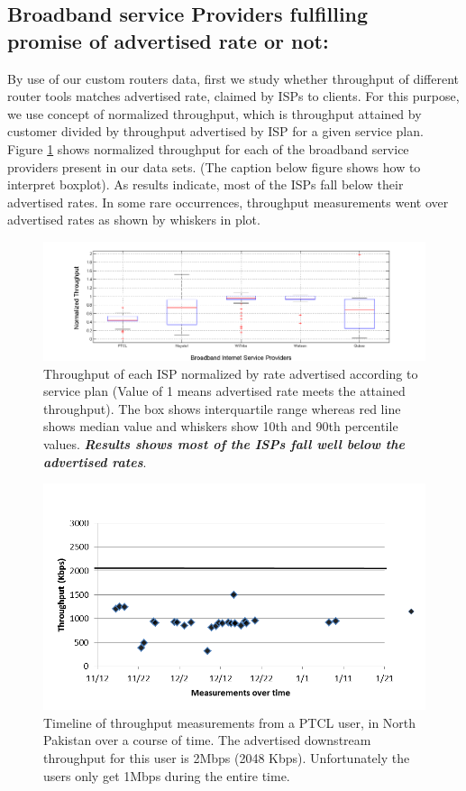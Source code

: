 \documentclass{sig-alternate-10pt}
\begin{document}
\subsection {Broadband service Providers fulfilling  \\ promise of advertised rate or not:}
\indent By use of our custom routers data, first we study whether throughput of different router tools matches advertised rate, claimed by ISPs to clients. For this purpose, we use concept of normalized throughput, which is throughput attained by customer divided by throughput advertised by ISP for a given service plan. Figure \ref{Fig:normalized} shows normalized throughput for each of the broadband service providers present in our data sets. (The caption below figure shows how to interpret boxplot). As results indicate, most of the ISPs fall below their advertised rates. In some rare occurrences, throughput measurements went over advertised rates as shown by whiskers in plot.
\begin{figure}[h!]
\begin {center}
   \includegraphics[height=0.2 \textheight,width=0.5 \textwidth]{normalized.png}
   \end {center}
 \caption{Throughput of each ISP normalized by rate advertised according to service plan (Value of 1 means advertised rate meets the attained throughput). The box shows interquartile range whereas red line shows median value and whiskers show 10th and 90th  percentile values. \emph{\textbf{Results shows most of the ISPs fall well below the advertised rates}}.}
\label{Fig:normalized}
\end{figure}


\begin{figure}[h!]
\begin {center}
   \includegraphics[height=0.2 \textheight,width=0.5 \textwidth]{3.png}
   \end {center}
 \caption{Timeline of throughput measurements from a PTCL user, in North Pakistan over a course of time. The advertised downstream throughput for this user is 2Mbps (2048 Kbps). Unfortunately the users only get 1Mbps during the entire time.}
 \label{Fig:3}
\end{figure}
\end{document}
